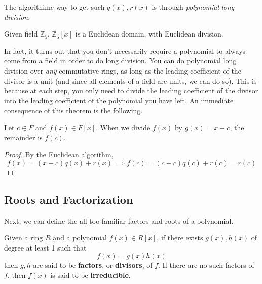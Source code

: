   \begin{example} 
    The algorithimc way to get such $q(x), r(x)$ is through \textit{polynomial long division}. 
    
    \begin{center}
    \end{center}

    Given field $\mathbb{Z}_5$, $\mathbb{Z}_5[x]$ is a Euclidean domain, with Euclidean division.  
  \end{example} 

  In fact, it turns out that you don't necessarily require a polynomial to always come from a field in order to do long division. You can do polynomial long division over \textit{any} commutative rings, as long as the leading coefficient of the divisor is a unit (and since all elements of a field are units, we can do so). This is because at each step, you only need to divide the leading coefficient of the divisor into the leading coefficient of the polynomial you have left. An immediate consequence of this theorem is the following. 

  \begin{corollary}
    Let $c \in F$ and $f(x) \in F[x]$. When we divide $f(x)$ by $g(x) = x - c$, the remainder is $f(c)$. 
  \end{corollary}
  \begin{proof}
    By the Euclidean algorithm, 
    \begin{equation}
      f(x) = (x - c) q(x) + r(x) \implies f(c) = (c - c) q(c) + r(c) = r(c)
    \end{equation}
  \end{proof} 

\subsection{Roots and Factorization} 

  Next, we can define the all too familiar factors and roots of a polynomial. 

  \begin{definition}[Factor]
    Given a ring $R$ and a polynomial $f(x) \in R[x]$, if there exists $g(x), h(x)$ of degree at least 1 such that 
    \begin{equation}
      f(x) = g(x) h(x)
    \end{equation}
    then $g, h$ are said to be \textbf{factors}, or \textbf{divisors}, of $f$. If there are no such factors of $f$, then $f(x)$ is said to be \textbf{irreducible}. 
  \end{definition}


